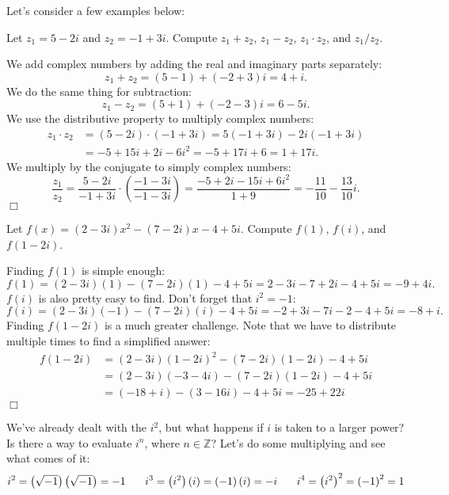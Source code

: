 \documentclass[../book.tex]{subfiles}
\begin{document}
\noindent Let's consider a few examples below:
\begin{example}
Let $z_1=5-2i$ and $z_2=-1+3i$.  Compute $z_1+z_2$, $z_1-z_2$, $z_1\cdot z_2$, and $z_1/z_2$.
\end{example}
\begin{solution}
We add complex numbers by adding the real and imaginary parts separately: $$z_1+z_2=\left(5-1\right)+\left(-2+3\right)i=4+i.$$
We do the same thing for subtraction:
$$z_1-z_2=\left(5+1\right)+\left(-2-3\right)i=6-5i.$$
We use the distributive property to multiply complex numbers: \begin{align*}
    z_1\cdot z_2&=\left(5-2i\right)\cdot\left(-1+3i\right)=5\left(-1+3i\right)-2i\left(-1+3i\right) \\
    &=-5+15i+2i-6i^2=-5+17i+6=1+17i.
\end{align*}
We multiply by the conjugate to simply complex numbers:
$$\frac{z_1}{z_2}=\frac{5-2i}{-1+3i}\cdot\left(\frac{-1-3i}{-1-3i}\right)=\frac{-5+2i-15i+6i^2}{1+9}=-\frac{11}{10}-\frac{13}{10}i.$$$\Box$
\end{solution}
\begin{example}
Let $f(x)=\left(2-3i\right)x^2-\left(7-2i\right)x-4+5i$.  Compute $f(1)$, $f(i)$, and $f(1-2i)$.
\end{example}
\begin{solution}
Finding $f(1)$ is simple enough:
$$f(1)=\left(2-3i\right)(1)-\left(7-2i\right)(1)-4+5i=2-3i-7+2i-4+5i=-9+4i.$$
$f(i)$ is also pretty easy to find.  Don't forget that $i^2=-1$:
$$f(i)=\left(2-3i\right)(-1)-\left(7-2i\right)(i)-4+5i=-2+3i-7i-2-4+5i=-8+i.$$
Finding $f(1-2i)$ is a much greater challenge.  Note that we have to distribute multiple times to find a simplified answer: \begin{align*}
   f(1-2i)&=\left(2-3i\right)\left(1-2i\right)^2-\left(7-2i\right)\left(1-2i\right)-4+5i \\
   &=\left(2-3i\right)\left(-3-4i\right)-\left(7-2i\right)\left(1-2i\right)-4+5i \\
   &= \left(-18+i\right)-\left(3-16i\right)-4+5i = -25+22i
\end{align*}$\Box$
\end{solution}
\noindent We've already dealt with the $i^2$, but what happens if $i$ is taken to a larger power?  Is there a way to evaluate $i^n$, where $n\in\mathbb{Z}$?  Let's do some multiplying and see what comes of it:
$$i^2=\left(\sqrt{-1}\right)\left(\sqrt{-1}\right)=-1 \hspace{0.25in} i^3=\left(i^2\right)(i)=\left(-1\right)(i)=-i \hspace{0.25in} i^4=\left(i^2\right)^2=\left(-1\right)^2=1$$
\end{document}
